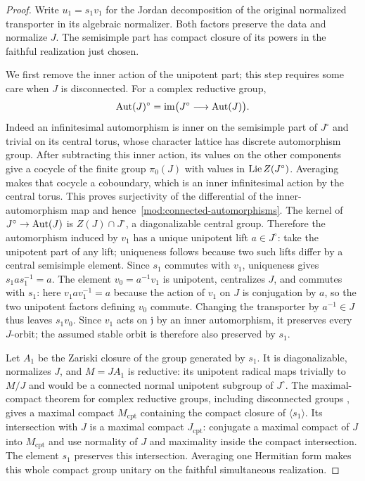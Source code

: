 \begin{proof}
Write $u_1=s_1v_1$ for the Jordan decomposition of the original
normalized transporter in its algebraic normalizer. Both factors
preserve the data and normalize $J$. The semisimple part has compact
closure of its powers in the faithful realization just chosen.

We first remove the inner action of the unipotent part; this step
requires some care when $J$ is disconnected. For a complex reductive
group,
\begin{equation}
\label{mod:connected-automorphisms}
 \operatorname{Aut}(J)^\circ=\operatorname{im}\bigl(J^\circ\longrightarrow\operatorname{Aut}(J)\bigr).
\end{equation}
Indeed an infinitesimal automorphism is inner on the semisimple part
of $J^\circ$ and trivial on its central torus, whose character
lattice has discrete automorphism group. After subtracting this
inner action, its values on the other components give a cocycle of
the finite group $\pi_0(J)$ with values in
$\operatorname{Lie} Z(J^\circ)$. Averaging makes that cocycle a coboundary,
which is an inner infinitesimal action by the central torus. This
proves surjectivity of the differential of the inner-automorphism
map and hence~\eqref{mod:connected-automorphisms}.
The kernel of $J^\circ\to\operatorname{Aut}(J)$ is $Z(J)\cap J^\circ$, a diagonalizable central
group. Therefore the automorphism induced by $v_1$ has a unique
unipotent lift $a\in J^\circ$: take the unipotent part of any
lift; uniqueness follows because two such lifts differ by a central
semisimple element. Since $s_1$ commutes with $v_1$, uniqueness
gives $s_1as_1^{-1}=a$. The element $v_0=a^{-1}v_1$ is unipotent,
centralizes $J$, and commutes with $s_1$: here $v_1av_1^{-1}=a$
because the action of $v_1$ on $J$ is conjugation by $a$, so the
two unipotent factors defining $v_0$ commute. Changing the
transporter by $a^{-1}\in J$ thus leaves $s_1v_0$. Since $v_1$
acts on $\mathfrak j$ by an inner automorphism, it preserves every
$J$-orbit; the assumed stable orbit is therefore also preserved by
$s_1$.

Let $A_1$ be the Zariski closure of the group generated by $s_1$.
It is diagonalizable, normalizes $J$, and $M=JA_1$ is reductive:
its unipotent radical maps trivially to $M/J$ and would be a
connected normal unipotent subgroup of $J^\circ$. The
maximal-compact theorem for complex reductive groups, including
disconnected groups \cite[Definition~3.3 and
Theorems~3.6--3.7]{AdamsTaibi}, gives a
maximal compact $M_{\mathrm{cpt}}$ containing the compact closure
of $\langle s_1\rangle$. Its intersection with $J$ is a maximal
compact $J_{\mathrm{cpt}}$: conjugate a maximal compact of $J$
into $M_{\mathrm{cpt}}$ and use normality of $J$ and maximality
inside the compact intersection. The element $s_1$ preserves this
intersection. Averaging one
Hermitian form makes this whole compact group unitary on the
faithful simultaneous realization.


\end{proof}
